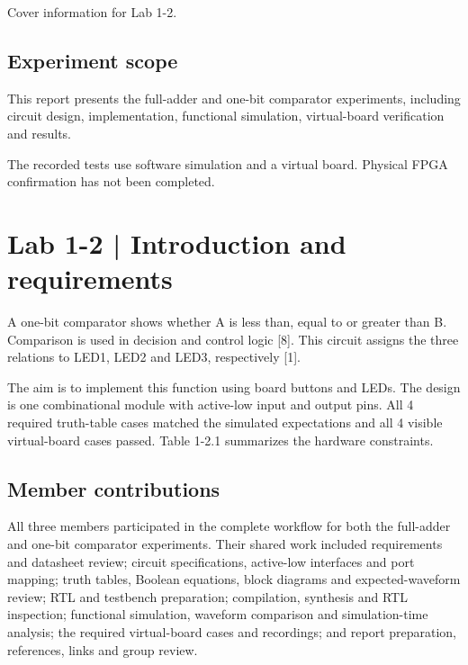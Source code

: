 \documentclass[10pt,a4paper]{article}
\begin{document}
{\small\raggedright Cover information for Lab 1-2.\par}

\subsection*{Experiment scope}

This report presents the full-adder and one-bit comparator experiments, including circuit design, implementation, functional simulation, virtual-board verification and results.\par

The recorded tests use software simulation and a virtual board. Physical FPGA confirmation has not been completed.\par

\clearpage

\section*{Lab 1-2 | Introduction and requirements}

A one-bit comparator shows whether A is less than, equal to or greater than B. Comparison is used in decision and control logic [8]. This circuit assigns the three relations to LED1, LED2 and LED3, respectively [1].\par

The aim is to implement this function using board buttons and LEDs. The design is one combinational module with active-low input and output pins. All 4 required truth-table cases matched the simulated expectations and all 4 visible virtual-board cases passed. Table 1-2.1 summarizes the hardware constraints.\par

\subsection*{Member contributions}

All three members participated in the complete workflow for both the full-adder and one-bit comparator experiments. Their shared work included requirements and datasheet review; circuit specifications, active-low interfaces and port mapping; truth tables, Boolean equations, block diagrams and expected-waveform review; RTL and testbench preparation; compilation, synthesis and RTL inspection; functional simulation, waveform comparison and simulation-time analysis; the required virtual-board cases and recordings; and report preparation, references, links and group review.\par
\end{document}
